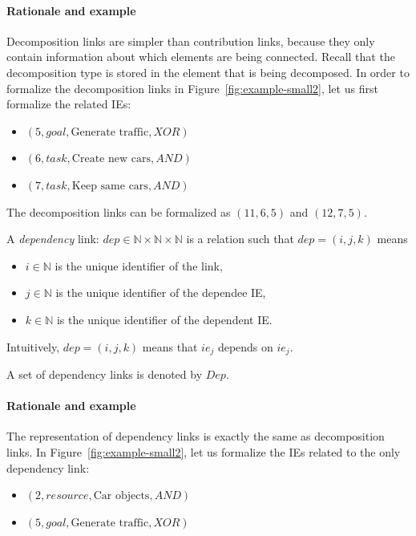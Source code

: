 \paragraph{Rationale and example} Decomposition links are simpler than contribution links, because they only contain information about which elements are being connected. Recall that the decomposition type is stored in the element that is being decomposed. In order to formalize the decomposition links in Figure~\ref{fig:example-small2}, let us first formalize the related IEs:
\begin{itemize}
\item $(5, goal, \text{Generate traffic}, XOR)$
\item $(6, task, \text{Create new cars}, AND)$
\item $(7, task, \text{Keep same cars}, AND)$
\end{itemize}
The decomposition links can be formalized as $(11, 6, 5)$ and $(12, 7, 5)$.

\begin{definition}
\label{def:link:dependency}
A \emph{dependency} link: $dep\in \mathbb{N}\times\mathbb{N}\times\mathbb{N}$ is a relation such that $dep = (i,j,k)$ means
\begin{itemize}
\item $i\in \mathbb{N}$ is the unique identifier of the link,
\item $j\in \mathbb{N}$ is the unique identifier of the dependee IE,
\item $k\in \mathbb{N}$ is the unique identifier of the dependent IE.
\end{itemize}
Intuitively, $dep = (i,j,k)$ means that $ie_j$ depends on $ie_j$.

A set of dependency links is denoted by $Dep$.
\end{definition}

\paragraph{Rationale and example} The representation of dependency links is exactly the same as decomposition links. In Figure~\ref{fig:example-small2}, let us formalize the IEs related to the only dependency link:
\begin{itemize}
\item $(2, resource, \text{Car objects}, AND)$
\item $(5, goal, \text{Generate traffic}, XOR)$
\end{itemize}

